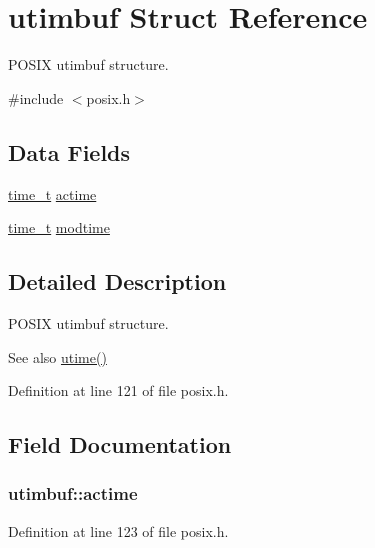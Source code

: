 \hypertarget{structutimbuf}{}\section{utimbuf Struct Reference}
\label{structutimbuf}


P\+O\+S\+IX utimbuf structure.  




{\ttfamily \#include $<$posix.\+h$>$}

\subsection*{Data Fields}
\begin{DoxyCompactItemize}
\item 
\hyperlink{time_8h_a3346b04b0420b32ccf6b706551b70762}{time\+\_\+t} \hyperlink{structutimbuf_aa39cf0bad7eff4df6239528506a557df}{actime}
\item 
\hyperlink{time_8h_a3346b04b0420b32ccf6b706551b70762}{time\+\_\+t} \hyperlink{structutimbuf_a7588ffe699a9eda52e94aa593bf7d6d8}{modtime}
\end{DoxyCompactItemize}


\subsection{Detailed Description}
P\+O\+S\+IX utimbuf structure. 

\begin{DoxySeeAlso}{See also}
\hyperlink{posix_8c_a732642e09075838bbbca28b3529f13db}{utime()} 
\end{DoxySeeAlso}


Definition at line 121 of file posix.\+h.



\subsection{Field Documentation}
\subsubsection[{\texorpdfstring{actime}{actime}}]{ utimbuf\+::actime}\hypertarget{structutimbuf_aa39cf0bad7eff4df6239528506a557df}{}\label{structutimbuf_aa39cf0bad7eff4df6239528506a557df}


Definition at line 123 of file posix.\+h.

